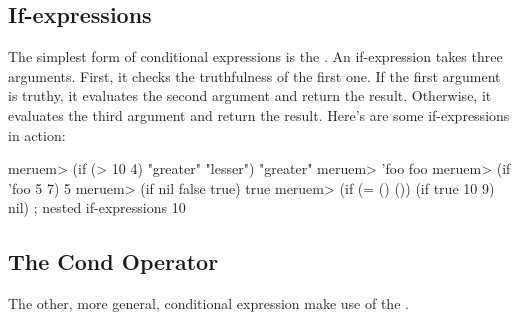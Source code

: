 \subsection{If-expressions}
The simplest form of conditional expressions is the . An if-expression takes three arguments. First, it checks the truthfulness of the first one. If the first argument is truthy, it evaluates the second argument and return the result. Otherwise, it evaluates the third argument and return the result. Here's are some if-expressions in action:

\begin{REPL}
meruem> (if (> 10 4) "greater" "lesser")
"greater"
meruem> 'foo                   
foo
meruem> (if 'foo 5 7)
5
meruem> (if nil false true)
true
meruem> (if (= () ()) (if true 10 9) nil)  ; nested if-expressions
10
\end{REPL}

\subsection{The Cond Operator}
The other, more general, conditional expression make use of the .